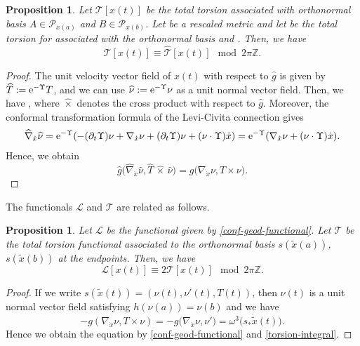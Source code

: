 \documentclass[pdftex]{sigma}
\newcommand{\wh}{\widehat}
\numberwithin{equation}{section}
\newtheorem{Proposition}[Theorem]{Proposition}
 { \theoremstyle{definition}
\newtheorem{Definition}[Theorem]{Definition}
\newtheorem*{Notation}{Notation}
\newtheorem{Example}[Theorem]{Example}
\newtheorem{Remark}[Theorem]{Remark} }
\begin{document}
\begin{Proposition}\label{conf-invariance-torsion}
Let $\mathscr{T}[x(t)]$ be the total torsion associated with orthonormal basis $A\in \mathcal{P}_{x(a)}$ and $B\in \mathcal{P}_{x(b)}$. Let \smash{$\wh g={\rm e}^{2\Upsilon}g$} be a rescaled metric and let \smash{$\wh{\mathscr{T}}[x(t)]$} be the total torsion for \smash{$\wh g$} associated with the orthonormal basis  and . Then, we have
\[
\mathscr{T}[x(t)]\equiv\wh{\mathscr{T}}[x(t)]\mod 2\pi\mathbb{Z}.
\]
\end{Proposition}
\begin{proof}
The unit velocity vector field of $x(t)$ with respect to $\wh g$ is given by $\wh T:={\rm e}^{-\Upsilon}T$, and we can use $\wh \nu:={\rm e}^{-\Upsilon}\nu$ as a unit normal vector field. Then, we have \smash{$\wh T\,\wh{\times}\,\wh \nu={\rm e}^{-\Upsilon}T\times \nu$}, where $\wh{\times}$ denotes the cross product with respect to $\wh g$. Moreover, the conformal transformation formula of the Levi-Civita connection gives
\begin{align*}
\wh\nabla_{\dot x}\wh\nu ={\rm e}^{-\Upsilon}
 (-(\partial_t \Upsilon) \nu+\nabla_{\dot x}\nu+(\partial_t\Upsilon) \nu +(\nu\cdot \Upsilon) \dot x )
 ={\rm e}^{-\Upsilon} (\nabla_{\dot x}\nu+(\nu\cdot \Upsilon) \dot x ).
\end{align*}
Hence, we obtain
\[
\wh g\bigl(\wh\nabla_{\dot x}\wh\nu, \wh T\,\wh{\times}\,\wh \nu\bigr)
=g\bigl(\nabla_{\dot x}\nu, T\times \nu\bigr).
\tag*{\qed}
\]
\renewcommand{\qed}{}
\end{proof}

The functionals $\mathscr{L}$ and $\mathscr{T}$ are related as follows.

\begin{Proposition}\label{F-T}
Let $\mathscr{L}$ be the functional given by \eqref{conf-geod-functional}. Let $\mathscr{T}$ be the total torsion functional associated to the orthonormal basis $s(\tilde x(a))$, $s(\tilde x(b))$ at the endpoints. Then, we have
\[
\mathscr{L}[x(t)]\equiv 2\mathscr{T}[x(t)]\mod 2\pi\mathbb{Z}.
\]
\end{Proposition}
\begin{proof}
If we write $s(\tilde x(t))=(\nu(t), \nu'(t), T(t))$, then $\nu(t)$ is a unit normal vector field satisfying $h(\nu(a))=\nu(b)$ and we have
\[
-g(\nabla_{\dot x}\nu, T\times \nu)=-g\bigl(\nabla_{\dot x}\nu, \nu'\bigr)=\omega^3\bigl(s_*\dot{\tilde x}(t)\bigr).
\]
Hence we obtain the equation by \eqref{conf-geod-functional} and \eqref{torsion-integral}.
\end{proof}
\end{document}
